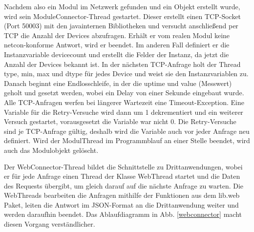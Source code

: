 \documentclass[a4paper,14pt,headsepline]{scrartcl}
\begin{document}
Nachdem also ein Modul im Netzwerk gefunden und ein Objekt erstellt wurde, wird sein ModuleConnector-Thread gestartet. Dieser erstellt einen TCP-Socket (Port 50003) mit den javainternen Bibliotheken und versucht anschließend per TCP die Anzahl der Devices abzufragen. Erhält er vom realen Modul keine netcon-konforme Antwort, wird er beendet. Im anderen Fall definiert er die Instanzvariable devicecount und erstellt die Felder der Instanz, da jetzt die Anzahl der Devices bekannt ist. In der nächsten TCP-Anfrage holt der Thread type, min, max und dtype für jedes Device und weist sie den Instanzvariablen zu. Danach beginnt eine Endlosschleife, in der die uptime und value (Messwert) geholt und gesetzt werden, wobei ein Delay von einer Sekunde eingebaut wurde. Alle TCP-Anfragen werfen bei längerer Wartezeit eine Timeout-Exception. Eine Variable für die Retry-Versuche wird dann um 1 dekrementiert und ein weiterer Versuch gestartet, vorausgesetzt die Variable war nicht 0. Die Retry-Versuche sind je TCP-Anfrage gültig, deshalb wird die Variable auch vor jeder Anfrage neu definiert. Wird der ModulThread im Programmblauf an einer Stelle beendet, wird auch das Modulobjekt gelöscht.

Der WebConnector-Thread bildet die Schnittstelle zu Drittanwendungen, wobei er für jede Anfrage einen Thread der Klasse WebThread startet und die Daten des Requests übergibt, um gleich darauf auf die nächste Anfrage zu warten. Die WebThreads bearbeiten die Anfragen mithilfe der Funktionen aus dem lib.web Paket, leiten die Antwort im JSON-Format an die Drittanwendung weiter und werden daraufhin beendet. Das Ablaufdiagramm in Abb. \ref{webconnector} macht diesen Vorgang verständlicher. 

\newpage
\end{document}
